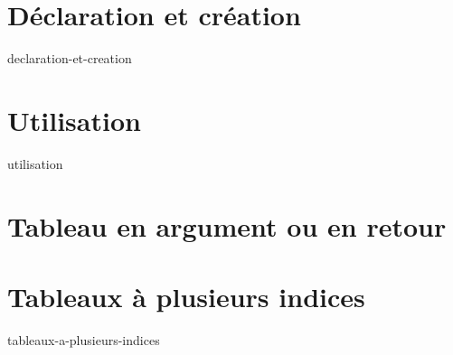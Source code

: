 \section{Déclaration et création}\label{sec:declaration-et-creation}
{declaration-et-creation}

\section{Utilisation}
{utilisation}

\section{Tableau en argument ou en retour}\label{sec:tableau-en-argument-ou-en-retour}

\section{Tableaux à plusieurs indices}\label{sec:tableaux-a-plusieurs-indices}
{tableaux-a-plusieurs-indices}